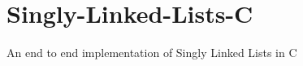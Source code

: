 \chapter{Singly-\/\+Linked-\/\+Lists-\/C}
\hypertarget{md_README}{}\label{md_README}
\label{md_README_autotoc_md0}%
%
An end to end implementation of Singly Linked Lists in C 